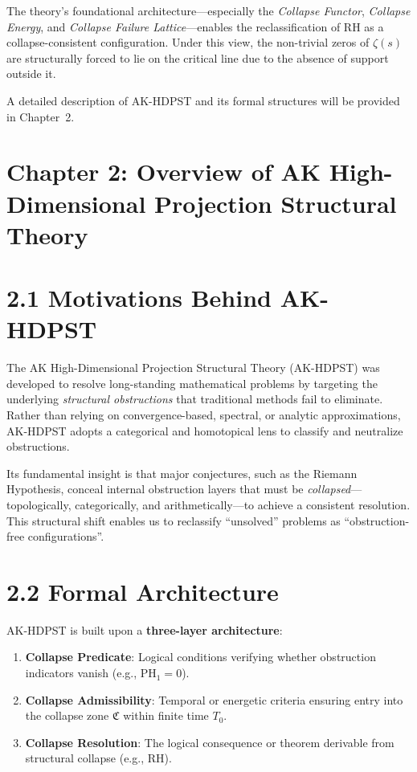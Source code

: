 \documentclass[11pt]{article}
\begin{document}
The theory’s foundational architecture—especially the \emph{Collapse Functor}, \emph{Collapse Energy}, and \emph{Collapse Failure Lattice}—enables the reclassification of RH as a collapse-consistent configuration. Under this view, the non-trivial zeros of \( \zeta(s) \) are structurally forced to lie on the critical line due to the absence of support outside it.

A detailed description of AK-HDPST and its formal structures will be provided in Chapter~2.



\section*{Chapter 2: Overview of AK High-Dimensional Projection Structural Theory}

\section*{2.1 Motivations Behind AK-HDPST}

The AK High-Dimensional Projection Structural Theory (AK-HDPST) was developed to resolve long-standing mathematical problems by targeting the underlying \textit{structural obstructions} that traditional methods fail to eliminate. Rather than relying on convergence-based, spectral, or analytic approximations, AK-HDPST adopts a categorical and homotopical lens to classify and neutralize obstructions.

Its fundamental insight is that major conjectures, such as the Riemann Hypothesis, conceal internal obstruction layers that must be \emph{collapsed}—topologically, categorically, and arithmetically—to achieve a consistent resolution. This structural shift enables us to reclassify “unsolved” problems as “obstruction-free configurations”.

\section*{2.2 Formal Architecture}

AK-HDPST is built upon a \textbf{three-layer architecture}:

\begin{enumerate}
  \item \textbf{Collapse Predicate}: Logical conditions verifying whether obstruction indicators vanish (e.g., \( \mathrm{PH}_1 = 0 \)).
  \item \textbf{Collapse Admissibility}: Temporal or energetic criteria ensuring entry into the collapse zone \( \mathfrak{C} \) within finite time \( T_0 \).
  \item \textbf{Collapse Resolution}: The logical consequence or theorem derivable from structural collapse (e.g., RH).
\end{enumerate}
\end{document}

